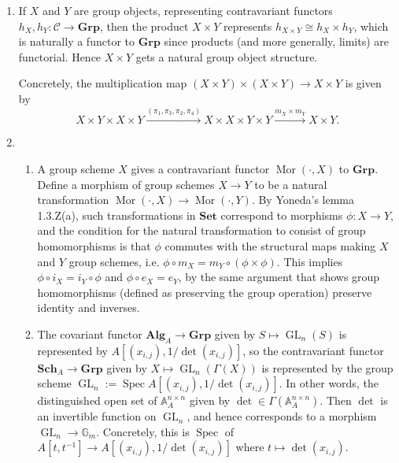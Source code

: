 \documentclass{report}
\newcommand{\cat}[1]{\mathbf{#1}} %
\newcommand{\scrC}{\mathscr{C}}
\newcommand{\A}{\mathbb{A}}
\newcommand{\G}{\mathbb{G}}
\DeclareMathOperator{\GL}{GL}
\DeclareMathOperator{\Mor}{Mor}
\DeclareMathOperator{\Spec}{Spec}
\begin{document}
\begin{enumerate}[label=\textbf{6.6.\Alph*.}]
	\item If $X$ and $Y$ are group objects, representing contravariant
	      functors $h_X,h_Y:\scrC\to\cat{Grp}$, then the product $X\times Y$
	      represents $h_{X\times Y}\cong h_X\times h_Y$, which is naturally a
	      functor to $\cat{Grp}$ since products (and more generally, limits) are
	      functorial. Hence $X\times Y$ gets a natural group object structure.

	      Concretely, the multiplication map
	      $(X\times Y)\times(X\times Y)\to X\times Y$ is given by
	      \begin{equation*}
		      X\times Y\times X\times Y
		      \xrightarrow{(\pi_1,\pi_3,\pi_2,\pi_4)} X\times X\times Y\times Y
		      \xrightarrow{m_X\times m_Y} X\times Y.
	      \end{equation*}

	\item
	      \begin{enumerate}[label=(\alph*)]
		      \item A group scheme $X$ gives a contravariant functor
		            $\Mor(\cdot,X)$ to $\cat{Grp}$. Define a morphism of group
		            schemes $X\to Y$ to be a natural transformation
		            $\Mor(\cdot,X)\to\Mor(\cdot,Y)$. By Yoneda's lemma 1.3.Z(a),
		            such transformations in $\cat{Set}$ correspond to morphisms
		            $\phi:X\to Y$, and the condition for the natural
		            transformation to consist of group homomorphisms is that
		            $\phi$ commutes with the structural maps making $X$ and $Y$
		            group schemes, i.e. $\phi\circ m_X=m_Y\circ(\phi\times\phi)$.
		            This implies $\phi\circ i_X=i_Y\circ\phi$ and
		            $\phi\circ e_X=e_Y$, by the same argument that shows group
		            homomorphisms (defined as preserving the group operation)
		            preserve identity and inverses.

		      \item The covariant functor $\cat{Alg}_A\to\cat{Grp}$ given by
		            $S\mapsto\GL_n(S)$ is represented by
		            $A[(x_{i,j}),1/\det(x_{i,j})]$, so the contravariant functor
		            $\cat{Sch}_A\to\cat{Grp}$ given by $X\mapsto\GL_n(\Gamma(X))$
		            is represented by the group scheme
		            $\GL_n:=\Spec A[(x_{i,j}),1/\det(x_{i,j})]$. In other words,
		            the distinguished open set of $\A^{n\times n}_A$ given by
		            $\det\in\Gamma(\A^{n\times n}_A)$. Then $\det$ is an
		            invertible function on $\GL_n$, and hence corresponds to a
		            morphism $\GL_n\to\G_m$. Concretely, this is $\Spec$ of
		            $A[t,t^{-1}]\to A[(x_{i,j}),1/\det(x_{i,j})]$ where
		            $t\mapsto\det(x_{i,j})$.


\end{enumerate}
\end{enumerate}
\end{document}

